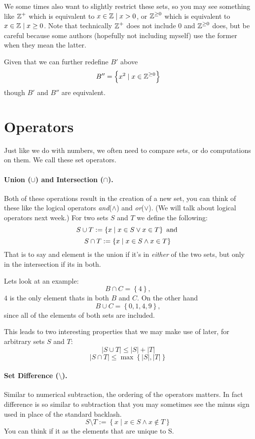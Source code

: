 We some times also want to slightly restrict these sets, so you may see something like $\operatorname{\mathbb{Z}}^+$ which is equivalent to ${x \in \operatorname{\mathbb{Z}} \mid x > 0}$, 
or $\operatorname{\mathbb{Z}}^{\ge0}$ which is equivalent to ${x \in \operatorname{\mathbb{Z}} \mid x \ge 0}$.
Note that technically $\operatorname{\mathbb{Z}}^+$ does not include 0 and $\operatorname{\mathbb{Z}}^{\ge0}$ does, 
but be careful because some authors (hopefully not including myself) use the former when they mean the latter. 

Given that we can further redefine $B'$ above 
\[
B'' = \left\{x^2 \mid x \in \operatorname{\mathbb{Z}}^{\ge0} \right\}
\]
 though $B'$ and $B''$ are equivalent. 
 
\section{Operators}

Just like we do with numbers, we often need to compare sets, or do computations on them.
We call these set operators. 

\paragraph{Union ($\cup$) and Intersection ($\cap$).}
Both of these operations result in the creation of a new set, 
you can think of these like the logical operators \textit{and}($\wedge$) and \textit{or}($\vee$). (We will talk about logical operators next week.)
For two sets $S$ and $T$ we define the following: 
\[
S\cup T := \left\{x \mid x \in S \vee x \in T\right\} \textnormal{ and }
\]\[
S\cap T := \left\{x \mid x \in S \wedge x \in T\right\} \\
\]
That is to say and element is the union if it's in \textit{either} of the two sets, but only in the intersection if its in both. 

Lets look at an example:
\[
B \cap C = \left\{4\right\},
\]
$4$ is the only element thats in both $B$ and $C$. 
On the other hand 
\[
B \cup C = \left\{0,1,4,9\right\},
\]
since all of the elements of both sets are included. 

This leads to two interesting properties that we may make use of later, for arbitrary sets $S$ and $T$: 
\[
|S\cup T| \le  |S| + |T|
\]
\[
|S\cap T| \le \max\left\{|S|, |T|\right\}
\]

\paragraph{Set Difference ($\setminus$).}
Similar to numerical subtraction, the ordering of the operators matters. 
In fact difference is so similar to subtraction that you may sometimes see the minus sign used in place of the standard backlash. 
\[
S\setminus T  := \left\{x \mid x \in S \wedge x \notin T\right\} 
\]
You can think if it as the elements that are unique to S. 

